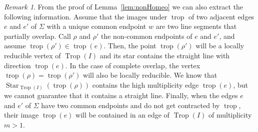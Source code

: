\documentclass[11pt]{amsart}
\numberwithin{equation}{section}
\theoremstyle{plain}
\theoremstyle{definition}
\theoremstyle{remark}
\newtheorem{remark}[theorem]{Remark}
\begin{document}
\begin{remark}
  From the proof of Lemma~\ref{lem:nonHomeo} we can also extract the
  following information. Assume that the images under $\operatorname{trop}$ of two
  adjacent edges $e$ and $e'$ of $\Sigma$ with a unique common
  endpoint $w$ are two line segments that partially overlap. Call
  $\rho$ and $\rho'$ the non-common endpoints of $e$ and $e'$, and
  assume $\operatorname{trop}(\rho')\in \operatorname{trop}(e)$. Then, the point $\operatorname{trop}(\rho')$
  will be a locally reducible vertex of $\operatorname{Trop}(I)$ and its star
  contains the straight line with direction $\operatorname{trop}(e)$. In the case of
  complete overlap, the vertex $\operatorname{trop}(\rho)=\operatorname{trop}(\rho')$ will also be
  locally reducible. We know that $\operatorname{\ensuremath{Star}}_{\operatorname{Trop}(I)}(\operatorname{trop}(\rho))$
  contains the high multiplicity edge $\operatorname{trop}(e)$, but we cannot
  guarantee that it contains a straight line. Finally, when the edges
  $e$ and $e'$ of $\Sigma$ have two common endpoints and do not get
  contracted by $\operatorname{trop}$, their image $\operatorname{trop}(e)$ will be contained in
  an edge of $\operatorname{Trop}(I)$ of multiplicity $m>1$.
\end{remark}
\end{document}
